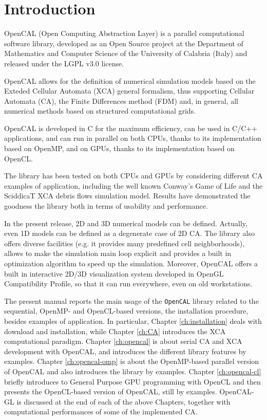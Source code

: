 \chapter{Introduction}

OpenCAL (Open Computing Abstraction Layer) is a parallel computational
software library, developed as an Open Source project at the
Department of Mathematics and Computer Science of the University of
Calabria (Italy) and released under the LGPL v3.0 license.

OpenCAL allows for the definition of numerical simulation models based
on the Exteded Cellular Automata (XCA) general formalism, thus
supporting Cellular Automata (CA), the Finite Differences method (FDM)
and, in general, all numerical methods based on structured
computational grids.

OpenCAL is developed in C for the maximum efficiency, can be used in
C/C++ applications, and can run in parallel on both CPUs, thanks to
its implementation based on OpenMP, and on GPUs, thanks to its
implementation based on OpenCL.

The library has been tested on both CPUs and GPUs by considering
different CA examples of application, including the well known
Conway's Game of Life and the SciddicaT XCA debris flows simulation
model. Results have demonstrated the goodness the library both in
terms of usability and performance.

In the present release, 2D and 3D numerical models can be
defined. Actually, even 1D models can be defined as a degenerate case
of 2D CA. The library also offers diverse facilities (e.g. it provides
many predefined cell neighborhoods), allows to make the simulation
main loop explicit and provides a built in optimization algorithm to
speed up the simulation. Moreover, OpenCAL offers a built in
interactive 2D/3D visualization system developed in OpenGL
Compatibility Profile, so that it can run everywhere, even on old
workstations.

The present manual reports the main usage of the \verb'OpenCAL'
library related to the sequential, OpenMP- and OpenCL-based versions,
the installation procedure, besides examples of application. In
particular, Chapter \ref{ch:installation} deals with download and
installation, while Chapter \ref{ch:CA} introduces the XCA
computational paradigm. Chapter \ref{ch:opencal} is about serial CA
and XCA development with OpenCAL, and introduces the different library
features by examples. Chapter \ref{ch:opencal-omp} is about the
OpenMP-based parallel version of OpenCAL and also introduces the
library by examples. Chapter \ref{ch:opencal-cl} briefly introduces to
General Purpose GPU programming with OpenCL and then presents the
OpenCL-based version of OpenCAL, still by examples. OpenCAL-GL is
discussed at the end of each of the above Chapters, together with
computational performances of some of the implemented CA.
